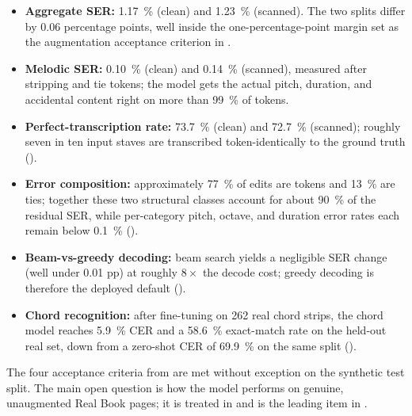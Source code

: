 \begin{itemize}
    \item \textbf{Aggregate SER:} \SI{1.17}{\percent} (clean) and
          \SI{1.23}{\percent} (scanned).
          The two splits differ by \num{0.06} percentage points,
          well inside the one-percentage-point margin set as the
          augmentation acceptance criterion in
          .
    \item \textbf{Melodic SER:} \SI{0.10}{\percent} (clean) and
          \SI{0.14}{\percent} (scanned), measured after stripping
           and tie tokens; the model gets the actual
          pitch, duration, and accidental content right on more than
          \SI{99}{\percent} of tokens.
    \item \textbf{Perfect-transcription rate:} \SI{73.7}{\percent}
          (clean) and \SI{72.7}{\percent} (scanned); roughly seven
          in ten input staves are transcribed token-identically to the
          ground truth ().
    \item \textbf{Error composition:} approximately \SI{77}{\percent}
          of edits are  tokens and \SI{13}{\percent} are
          ties; together these two structural classes account for
          about \SI{90}{\percent} of the residual SER, while
          per-category pitch, octave, and duration error rates each
          remain below \SI{0.1}{\percent} ().
    \item \textbf{Beam-vs-greedy decoding:} beam search yields a
          negligible SER change (well under \num{0.01} pp) at roughly
          $8\times$ the decode cost; greedy decoding is therefore the
          deployed default ().
    \item \textbf{Chord recognition:} after fine-tuning on \num{262} real
          chord strips, the chord model reaches \SI{5.9}{\percent} CER
          and a \SI{58.6}{\percent} exact-match rate on the held-out
          real set, down from a zero-shot CER of \SI{69.9}{\percent} on the
          same split ().
\end{itemize}

The four acceptance criteria from  are met
without exception on the synthetic test split.
The main open question is how the model performs on genuine,
unaugmented Real Book pages; it is treated in 
and is the leading item in .

